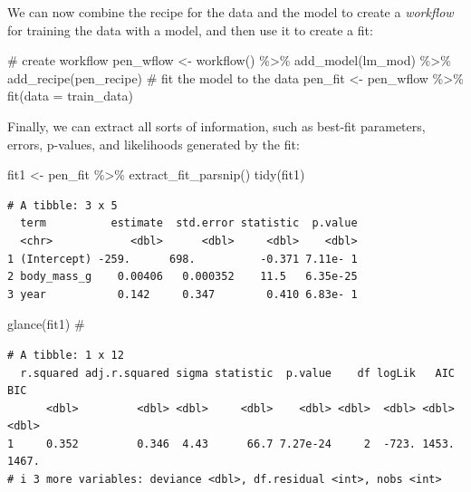 \documentclass[
  letterpaper,
  DIV=11,
  numbers=noendperiod]{scrreprt}
\newenvironment{Shaded}{\begin{snugshade}}{\end{snugshade}}
\newcommand{\AttributeTok}[1]{\textcolor[rgb]{0.40,0.45,0.13}{#1}}
\newcommand{\CommentTok}[1]{\textcolor[rgb]{0.37,0.37,0.37}{#1}}
\newcommand{\FunctionTok}[1]{\textcolor[rgb]{0.28,0.35,0.67}{#1}}
\newcommand{\NormalTok}[1]{\textcolor[rgb]{0.00,0.23,0.31}{#1}}
\newcommand{\OtherTok}[1]{\textcolor[rgb]{0.00,0.23,0.31}{#1}}
\newcommand{\SpecialCharTok}[1]{\textcolor[rgb]{0.37,0.37,0.37}{#1}}
\begin{document}
We can now combine the recipe for the data and the model to create a
\emph{workflow} for training the data with a model, and then use it to
create a fit:

\begin{Shaded}
\begin{Highlighting}[]
\CommentTok{\# create workflow}
\NormalTok{pen\_wflow }\OtherTok{\textless{}{-}} 
  \FunctionTok{workflow}\NormalTok{() }\SpecialCharTok{\%\textgreater{}\%} 
  \FunctionTok{add\_model}\NormalTok{(lm\_mod) }\SpecialCharTok{\%\textgreater{}\%} 
  \FunctionTok{add\_recipe}\NormalTok{(pen\_recipe)}
\CommentTok{\# fit the model to the data}
\NormalTok{pen\_fit }\OtherTok{\textless{}{-}} 
\NormalTok{  pen\_wflow }\SpecialCharTok{\%\textgreater{}\%} 
  \FunctionTok{fit}\NormalTok{(}\AttributeTok{data =}\NormalTok{ train\_data)}
\end{Highlighting}
\end{Shaded}

Finally, we can extract all sorts of information, such as best-fit
parameters, errors, p-values, and likelihoods generated by the fit:

\begin{Shaded}
\begin{Highlighting}[]
\NormalTok{fit1 }\OtherTok{\textless{}{-}}\NormalTok{ pen\_fit }\SpecialCharTok{\%\textgreater{}\%} 
  \FunctionTok{extract\_fit\_parsnip}\NormalTok{() }
\FunctionTok{tidy}\NormalTok{(fit1)}
\end{Highlighting}
\end{Shaded}

\begin{verbatim}
# A tibble: 3 x 5
  term          estimate  std.error statistic  p.value
  <chr>            <dbl>      <dbl>     <dbl>    <dbl>
1 (Intercept) -259.      698.          -0.371 7.11e- 1
2 body_mass_g    0.00406   0.000352    11.5   6.35e-25
3 year           0.142     0.347        0.410 6.83e- 1
\end{verbatim}

\begin{Shaded}
\begin{Highlighting}[]
\FunctionTok{glance}\NormalTok{(fit1) }\CommentTok{\# }
\end{Highlighting}
\end{Shaded}

\begin{verbatim}
# A tibble: 1 x 12
  r.squared adj.r.squared sigma statistic  p.value    df logLik   AIC   BIC
      <dbl>         <dbl> <dbl>     <dbl>    <dbl> <dbl>  <dbl> <dbl> <dbl>
1     0.352         0.346  4.43      66.7 7.27e-24     2  -723. 1453. 1467.
# i 3 more variables: deviance <dbl>, df.residual <int>, nobs <int>
\end{verbatim}
\end{document}
